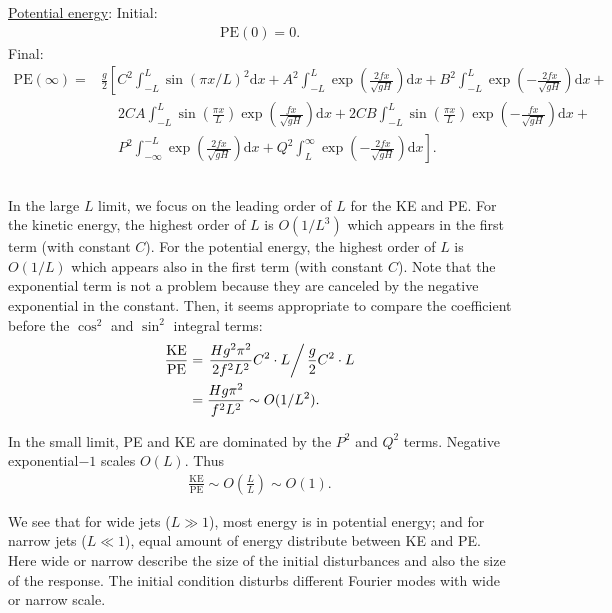 \documentclass[11pt,letterpaper]{book}
\theoremstyle{definition}
\newcommand{\de}{\mathrm{d}}
\begin{document}
\underline{Potential energy}: Initial:
\begin{align*}
\text{PE}(0) = 0.
\end{align*}
Final:
\begin{align*}
\text{PE}(\infty) =& \frac{g}{2}\left[
C^2\int^L_{-L}  \sin\left(\pi x/L\right)^2 \de x+ 
A^2\int^L_{-L}\exp\left(\frac{2fx}{\sqrt{gH}}\right)\de x +
B^2\int^L_{-L}\exp\left(-\frac{2fx}{\sqrt{gH}}\right)\de x   \right.+\\
&\quad\ \left. 2CA\int^L_{-L}\sin\left(\frac{\pi x}{L}\right)\exp\left(\frac{fx}{\sqrt{gH}}\right)\de x + 2CB\int^L_{-L}\sin\left(\frac{\pi x}{L}\right)\exp\left(-\frac{fx}{\sqrt{gH}}\right)\de x \right.+\\
&\quad\ \left.P^2\int^{-L}_{-\infty}\exp\left(\frac{2fx}{\sqrt{gH}}\right)\de x+
Q^2\int^{\infty}_{L}\exp\left(-\frac{2fx}{\sqrt{gH}}\right)\de x\right].
\end{align*}

\subsection{}
In the large $L$ limit, we focus on the leading order of $L$ for the KE and PE. For the kinetic energy, the highest order of $L$ is $O(1/L^3)$ which appears in the first term (with constant $C$). For the potential energy, the highest order of $L$ is $O(1/L)$ which appears also in the first term (with constant $C$). Note that the exponential term is not a problem because they are canceled by the negative exponential in the constant. Then, it seems appropriate to compare the coefficient before the $\cos^2$ and $\sin^2$ integral terms:
\begin{align*}
\frac{\text{KE}}{\text{PE}} &= \left.\frac{H g^2 \pi^2}{2f^2L^2}C^2\cdot L\right/ \frac{g}{2}C^2\cdot L\\
&= \frac{H g \pi^2}{f^2L^2} \sim O(1/L^2).
\end{align*}

In the small limit, PE and KE are dominated by the $P^2$ and $Q^2$ terms. Negative exponential$-1$ scales $O(L)$. Thus
\begin{align*}
\frac{\text{KE}}{\text{PE}} \sim O\left(\frac{L}{L}\right) \sim O(1).
\end{align*}

We see that for wide jets ($L\gg 1$), most energy is in potential energy; and for narrow jets ($L\ll 1$), equal amount of energy distribute between KE and PE. Here wide or narrow describe the size of the initial disturbances and also the size of the response. The initial condition disturbs different Fourier modes with wide or narrow scale.
\end{document}
